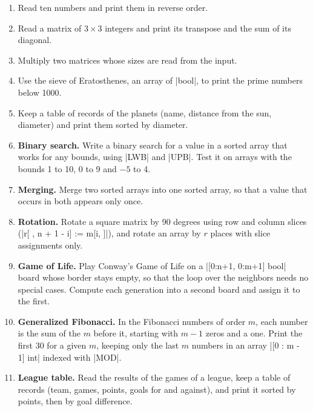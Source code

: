 \begin{enumerate}
\item Read ten numbers and print them in reverse order.
\item Read a matrix of $3 \times 3$ integers and print its transpose and
  the sum of its diagonal.
\item Multiply two matrices whose sizes are read from the input.
\item Use the sieve of Eratosthenes, an array of \code|bool|, to print
  the prime numbers below 1000.
\item Keep a table of records of the planets (name, distance from the sun,
  diameter) and print them sorted by diameter.
\item \textbf{Binary search.} Write a binary search for a value in a
  sorted array that works for any bounds, using \code|LWB| and
  \code|UPB|. Test it on arrays with the bounds 1 to 10, 0 to 9 and
  $-5$ to 4.
\item \textbf{Merging.} Merge two sorted arrays into one sorted array,
  so that a value that occurs in both appears only once.
\item \textbf{Rotation.} Rotate a square matrix by 90 degrees using row
  and column slices (\code|r[ , n + 1 - i] := m[i, ]|), and rotate an
  array by $r$ places with slice assignments only.
\item \textbf{Game of Life.} Play Conway's Game of Life on a
  \code|[0:n+1, 0:m+1] bool| board whose border stays empty, so that the
  loop over the neighbors needs no special cases. Compute each generation
  into a second board and assign it to the first.
\item \textbf{Generalized Fibonacci.} In the Fibonacci numbers of
  order $m$, each number is the sum of the $m$ before it, starting with
  $m - 1$ zeros and a one. Print the first 30 for a given $m$, keeping
  only the last $m$ numbers in an array \code|[0 : m - 1] int| indexed
  with \code|MOD|.
\item \textbf{League table.} Read the results of the games of a
  league, keep a table of records (team, games, points, goals for and
  against), and print it sorted by points, then by goal difference.
\end{enumerate}
